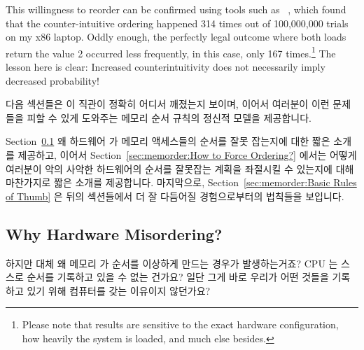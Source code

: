 This willingness to reorder can be confirmed using tools such as
~\cite{Alglave:2014:HCM:2594291.2594347},
which found that the counter-intuitive ordering happened
314 times out of 100,000,000 trials on my x86 laptop.
Oddly enough, the perfectly legal outcome where both loads return the
value 2 occurred less frequently, in this case, only 167 times.\footnote{
	Please note that results are sensitive to the exact hardware
	configuration,
	how heavily the system is loaded, and much else besides.}
The lesson here is clear: Increased counterintuitivity does not necessarily
imply decreased probability!
\fi

다음 섹션들은 이 직관이 정확히 어디서 깨졌는지 보이며, 이어서 여러분이 이런
문제들을 피할 수 있게 도와주는 메모리 순서 규칙의 정신적 모델을 제공합니다.

Section~\ref{sec:memorder:Why Hardware Misordering?}
왜 하드웨어 가 메모리 액세스들의 순서를 잘못 잡는지에 대한 짧은 소개를
제공하고, 이어서
Section~\ref{sec:memorder:How to Force Ordering?}
에서는 어떻게 여러분이 악의 사악한 하드웨어의 순서를 잘못잡는 계획을 좌절시킬
수 있는지에 대해 마찬가지로 짧은 소개를 제공합니다.
마지막으로, Section~\ref{sec:memorder:Basic Rules of Thumb} 은 뒤의 섹션들에서
더 잘 다듬어질 경험으로부터의 법칙들을 보입니다.

\subsection{Why Hardware Misordering?}
\label{sec:memorder:Why Hardware Misordering?}

하지만 대체 왜 메모리 가 순서를 이상하게 만드는 경우가 발생하는거죠?
CPU 는 스스로 순서를 기록하고 있을 수 없는 건가요?
일단 그게 바로 우리가 어떤 것들을 기록하고 있기 위해 컴퓨터를 갖는 이유이지
않던가요?
\iffalse

